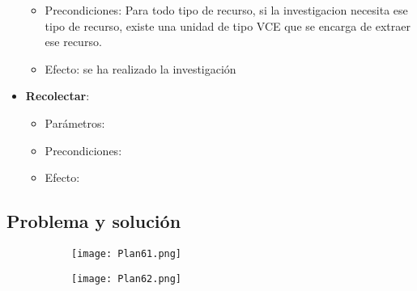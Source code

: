 \begin{itemize}
\begin{itemize}
         \item Precondiciones: Para todo tipo de recurso, si la investigacion necesita ese tipo de recurso, existe una unidad de tipo VCE que se encarga de extraer ese recurso.
         \item Efecto: se ha realizado la investigación
      \end{itemize}
   \item \textbf{Recolectar}:
         \begin{itemize}
            \item Parámetros:
            \item Precondiciones:
            \item Efecto:
         \end{itemize}
\end{itemize}
\subsection{Problema y solución}
\begin{figure}[H]

   \begin{subfigure}[b]{0.5\textwidth}
      \centering
      \texttt{[image: Plan61.png]}
   \end{subfigure}
   \hfill
   \begin{subfigure}[b]{0.5\textwidth}
      \centering
      \texttt{[image: Plan62.png]}
   \end{subfigure}
\end{figure}
